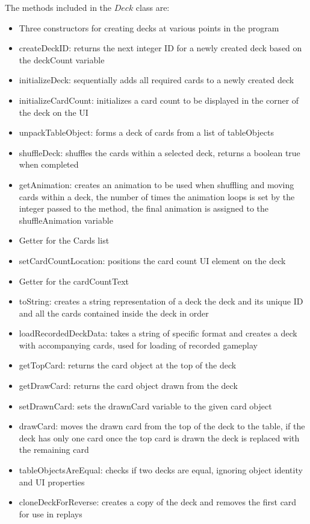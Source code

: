 \documentclass[a4paper]{project}
\begin{document}
				The methods included in the $Deck$ class are:
				
				\begin{itemize}
					\item Three constructors for creating decks at various points in the program
					\item createDeckID: returns the next integer ID for a newly created deck based on the deckCount variable
					\item initializeDeck: sequentially adds all required cards to a newly created deck
					\item initializeCardCount: initializes a card count to be displayed in the corner of the deck on the UI
					\item unpackTableObject: forms a deck of cards from a list of tableObjects
					\item shuffleDeck: shuffles the cards within a selected deck, returns a boolean true when completed
					\item getAnimation: creates an animation to be used when shuffling and moving cards within a deck, the number of times the animation loops is set by the integer passed to the method, the final animation is assigned to the shuffleAnimation variable
					\item Getter for the Cards list
					\item setCardCountLocation: positions the card count UI element on the deck 
					\item Getter for the cardCountText
					\item toString: creates a string representation of a deck the deck and its unique ID and all the cards contained inside the deck in order
					\item loadRecordedDeckData: takes a string of specific format and creates a deck with accompanying cards, used for loading of recorded gameplay
					\item getTopCard: returns the card object at the top of the deck
					\item getDrawCard: returns the card object drawn from the deck
					\item setDrawnCard: sets the drawnCard variable to the given card object
					\item drawCard: moves the drawn card from the top of the deck to the table, if the deck has only one card once the top card is drawn the deck is replaced with the remaining card
					\item tableObjectsAreEqual: checks if two decks are equal, ignoring object identity and UI properties
					\item cloneDeckForReverse: creates a copy of the deck and removes the first card for use in replays
				\end{itemize}
				
\end{document}
